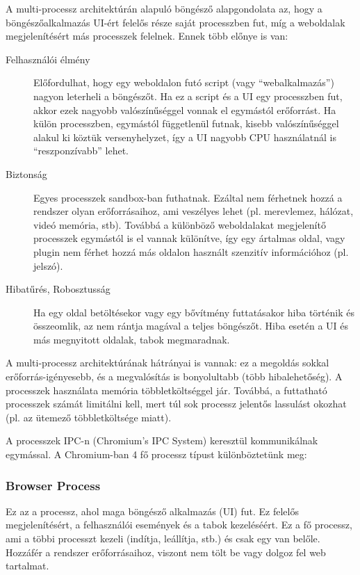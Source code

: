\documentclass[12pt]{report}
\begin{document}
A multi-processz architektúrán alapuló böngésző alapgondolata az, hogy a böngészőalkalmazás
UI-ért felelős része saját processzben fut, míg a weboldalak megjelenítésért más
processzek felelnek. Ennek több előnye is van: \cite{bib:chromium-blog-multi-process}
\begin{description}
    \item[Felhasználói élmény]
        Előfordulhat, hogy egy weboldalon futó script (vagy ``webalkalmazás'')
        nagyon leterheli a böngészőt. Ha ez a script és a UI egy processzben fut,
        akkor ezek nagyobb valószínűséggel vonnak el egymástól erőforrást. Ha külön
        processzben, egymástól függetlenül futnak, kisebb valószínűséggel alakul ki
        köztük versenyhelyzet, így a UI nagyobb CPU használatnál is ``reszponzívabb''
        lehet.
    \item[Biztonság]
        Egyes processzek sandbox-ban futhatnak. Ezáltal nem férhetnek hozzá a rendszer
        olyan erőforrásaihoz, ami veszélyes lehet (pl. merevlemez, hálózat,
        videó memória, stb).
        Továbbá a különböző weboldalakat megjelenítő processzek egymástól is el vannak
        különítve, így egy ártalmas oldal, vagy plugin nem férhet hozzá más oldalon használt
        szenzitív információhoz (pl. jelszó).
    \item[Hibatűrés, Robosztusság]
        Ha egy oldal betöltésekor vagy egy bővítmény futtatásakor hiba történik és
        összeomlik, az nem rántja magával a teljes böngészőt. Hiba esetén a UI és más
        megnyitott oldalak, tabok megmaradnak.
\end{description}

A multi-processz architektúrának hátrányai is vannak: ez a megoldás sokkal \\
erőforrás-igényesebb, és a megvalósítás is bonyolultabb (több hibalehetőség).
A processzek használata memória többletköltséggel jár. Továbbá, a futtatható processzek
számát limitálni kell, mert túl sok processz jelentős lassulást okozhat (pl. az ütemező
többletköltsége miatt).

A processzek IPC-n (Chromium's IPC System) keresztül kommunikálnak egymással.
A Chromium-ban 4 fő processz típust különböztetünk meg:

\subsubsection{Browser Process}
Ez az a processz, ahol maga böngésző alkalmazás (UI) fut. Ez felelős megjelenítésért,
a felhasználói események és a tabok kezeléséért. Ez a fő processz, ami a többi processzt
kezeli (indítja, leállítja, stb.) és csak egy van belőle. Hozzáfér a rendszer erőforrásaihoz,
viszont nem tölt be vagy dolgoz fel web tartalmat.
\end{document}
